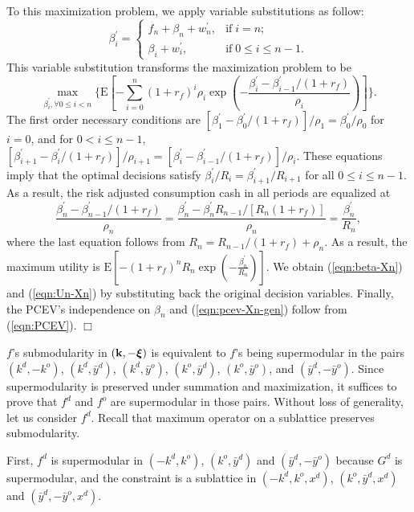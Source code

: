 \documentclass[mnsc,nonblindrev,copyedit]{informs2_wz} %
\newcommand{\E}{\mathrm{E}}
\newcommand{\qed}{ \hfill $\Box$ }
\newcommand{\xiv}{\mbox{\boldmath$\xi$}}
\begin{document}
To this maximization problem, we apply variable substitutions as follow:
\begin{equation*}
\beta_i^{\prime} = \left\{ \begin{array}{ll}
f_n + \beta_n + w_n^\prime, & \mbox{if}\; i = n; \\
\beta_i + w_i^\prime, & \mbox{if} \;  0\leq i \leq n-1.
\end{array}
\right.
\end{equation*}
This variable substitution transforms the maximization problem to be
\begin{equation*}
\max_{\beta_i^{\prime}, \forall 0 \leq i < n}\{\E[ - \sum_{i=0}^{n}(1+r_f)^i\rho_i \exp (-\frac{\beta^\prime_{i} -\beta^\prime_{i-1}/(1+r_f)}{\rho_i}) ]\}.
\end{equation*}
The first order necessary conditions are $[
\beta^\prime_1 - \beta^\prime_0/(1+r_f)]/\rho_1 = \beta^\prime_0/\rho_0$ for $i=0$, and for $0 < i \leq n-1$, $[\beta^\prime_{i+1} -\beta^\prime_{i}/(1+r_f)]/\rho_{i+1}  = [\beta^\prime_{i} -\beta^\prime_{i-1}/(1+r_f)]/\rho_i$. These equations imply that the optimal decisions satisfy $\beta^\prime_i/R_i = \beta_{i+1}^\prime/R_{i+1}$ for all $ 0\leq i\leq n-1$. As a result, the risk adjusted consumption cash in all periods are equalized at
\[ \frac{\beta_n^\prime-\beta_{n-1}^\prime/(1+r_f)}{\rho_n} = \frac{\beta_n^\prime-\beta_{n}^\prime R_{n-1}/[R_n(1+r_f)]}{\rho_n}  = \frac{\beta_n^\prime}{R_n},\]
 where the last equation follows from $R_{n} = R_{n-1}/(1+r_f) + \rho_n$. As a result, the maximum utility is $\E[-(1+r_f)^nR_n \exp (- \frac{\beta^\prime_n}{R_n} )]$. We obtain (\ref{eqn:beta-Xn}) and (\ref{eqn:Un-Xn}) by substituting back the original decision variables. Finally, the PCEV's independence on $\beta_n$ and  (\ref{eqn:pcev-Xn-gen}) follow from (\ref{eqn:PCEV}).
\qed

\medskip

$f$'s submodularity in $(\bold k, -\xiv)$ is equivalent to $f$'s being supermodular in the pairs $(k^d, -k^o)$, $(k^d, \bar{y}^d)$, $(k^d, \bar{y}^o)$, $(k^o, \bar{y}^d)$, $(k^o,\bar{y}^o)$, and $(\bar{y}^d, -\bar{y}^o)$.  Since supermodularity is preserved under summation and maximization, it suffices to prove that $f^d$ and $f^o$ are supermodular in those pairs.  Without loss of generality, let us consider $f^d$.  Recall that maximum operator on a sublattice preserves submodularity.

First, $f^d$ is supermodular in $(-k^d,k^o)$, $(k^o,\bar{y}^d)$ and $(\bar{y}^d,-\bar{y}^o)$ because $G^d$ is supermodular, and the constraint is a sublattice in $(-k^d,k^o,x^d)$, $(k^o,\bar{y}^d,x^d)$ and $(\bar{y}^d,-\bar{y}^o,x^d)$.
\end{document}
